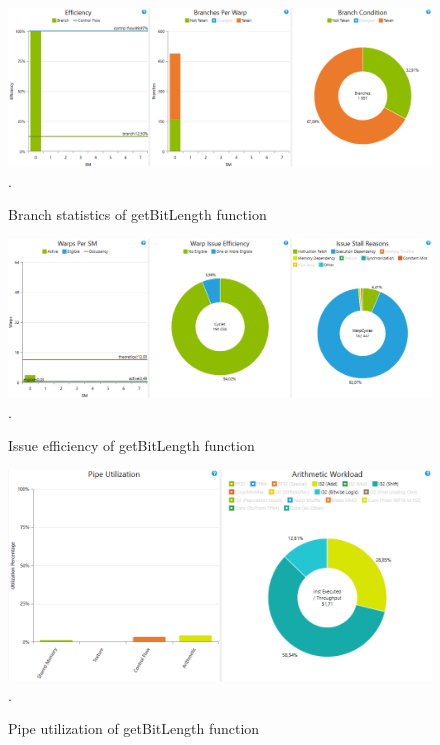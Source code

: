 \documentclass[oneside,openright,12pt,final,en]{mgr}
\begin{document}
\begin{figure}[H]
	\centering
	\includegraphics[width=\textwidth]{bitlength_branch}.
	\caption{Branch statistics of getBitLength function}
	\label{fig:bitlength_branch}
\end{figure}

\begin{figure}[H]
	\centering
	\includegraphics[width=\textwidth]{bitlength_issue}.
	\caption{Issue efficiency of getBitLength function}
	\label{fig:bitlength_issue}
\end{figure}

\begin{figure}[H]
	\centering
	\includegraphics[width=\textwidth]{bitlength_pipe}.
	\caption{Pipe utilization of getBitLength function}
	\label{fig:bitlength_pipe}
\end{figure}
\end{document}
